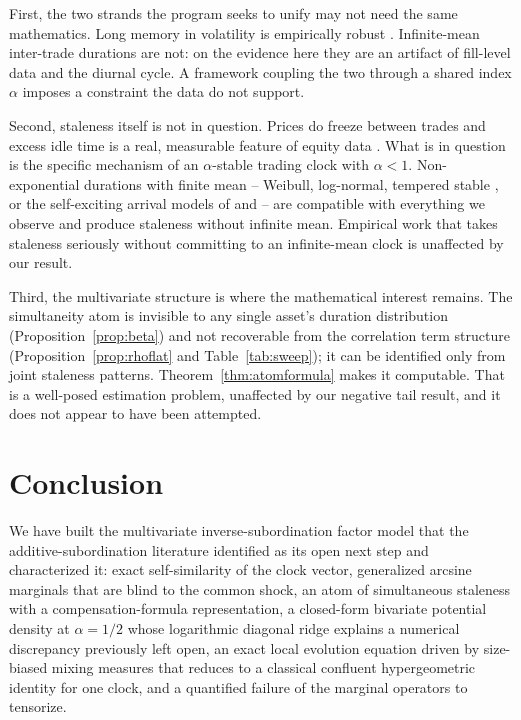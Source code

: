 \documentclass{ws-ijtaf}
\begin{document}
First, the two strands the program seeks to unify may not need the same
mathematics. Long memory in volatility is empirically robust \citep{gat18}.
Infinite-mean inter-trade durations are not: on the evidence here they are an
artifact of fill-level data and the diurnal cycle. A framework coupling the two
through a shared index $\alpha$ imposes a constraint the data do not support.

Second, staleness itself is not in question. Prices do freeze between trades and
excess idle time is a real, measurable feature of equity data \citep{ban17}.
What is in question is the specific mechanism of an $\alpha$-stable trading
clock with $\alpha<1$. Non-exponential durations with finite mean -- Weibull,
log-normal, tempered stable \citep{sem22,tor26}, or the self-exciting arrival
models of \citet{bac13} and \citet{eng98} -- are compatible with everything we
observe and produce staleness without infinite mean. Empirical work that takes
staleness seriously without committing to an infinite-mean clock
\citep{kon26} is unaffected by our result.

Third, the multivariate structure is where the mathematical interest remains.
The simultaneity atom is invisible to any single asset's duration distribution
(Proposition~\ref{prop:beta}) and not recoverable from the correlation term
structure (Proposition~\ref{prop:rhoflat} and Table~\ref{tab:sweep}); it can be
identified only from joint staleness patterns. Theorem~\ref{thm:atomformula}
makes it computable. That is a well-posed estimation problem, unaffected by our
negative tail result, and it does not appear to have been attempted.

\section{Conclusion}

We have built the multivariate inverse-subordination factor model that the
additive-subordination literature identified as its open next step and
characterized it: exact self-similarity of the clock vector, generalized arcsine
marginals that are blind to the common shock, an atom of simultaneous staleness
with a compensation-formula representation, a closed-form bivariate potential
density at $\alpha=1/2$ whose logarithmic diagonal ridge explains a numerical
discrepancy previously left open, an exact local evolution equation driven by
size-biased mixing measures that reduces to a classical confluent hypergeometric
identity for one clock, and a quantified failure of the marginal operators to
tensorize.
\end{document}
